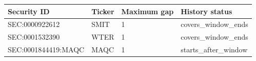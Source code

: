 \begin{tabular}{@{}llll@{}}
\toprule
Security ID & Ticker & Maximum gap & History status \\
\midrule
SEC:0000922612 & SMIT & 1 & covers\_window\_ends \\
SEC:0001532390 & WTER & 1 & covers\_window\_ends \\
SEC:0001844419:MAQC & MAQC & 1 & starts\_after\_window \\
\bottomrule
\end{tabular}
